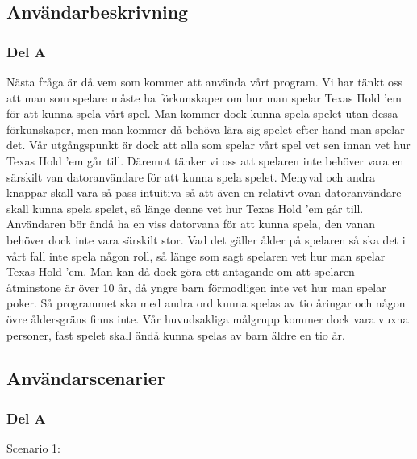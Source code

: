 \documentclass[10pt,a4paper]{article}
\begin{document}
\subsection*{Användarbeskrivning}

\subsubsection*{Del A}

Nästa fråga är då vem som kommer att använda vårt program. Vi har tänkt oss
att man som spelare måste ha förkunskaper om hur man spelar Texas Hold ’em
för att kunna spela vårt spel. Man kommer dock kunna spela spelet utan
dessa förkunskaper, men man kommer då behöva lära sig spelet efter hand man
spelar det. Vår utgångspunkt är dock att alla som spelar vårt spel vet sen
innan vet hur Texas Hold ’em går till. Däremot tänker vi oss att spelaren
inte behöver vara en särskilt van datoranvändare för att kunna spela
spelet. Menyval och andra knappar skall vara så pass intuitiva så att även
en relativt ovan datoranvändare skall kunna spela spelet, så länge denne
vet hur Texas Hold ’em går till. Användaren bör ändå ha en viss datorvana
för att kunna spela, den vanan behöver dock inte vara särskilt stor. Vad
det gäller ålder på spelaren så ska det i vårt fall inte spela någon roll,
så länge som sagt spelaren vet hur man spelar Texas Hold ’em. Man kan då
dock göra ett antagande om att spelaren åtminstone är över 10 år, då yngre
barn förmodligen inte vet hur man spelar poker. Så programmet ska med andra
ord kunna spelas av tio åringar och någon övre åldersgräns finns inte. Vår
huvudsakliga målgrupp kommer dock vara vuxna personer, fast spelet skall
ändå kunna spelas av barn äldre en tio år.

\subsection*{Användarscenarier}

\subsubsection*{Del A}

Scenario 1:
\end{document}
